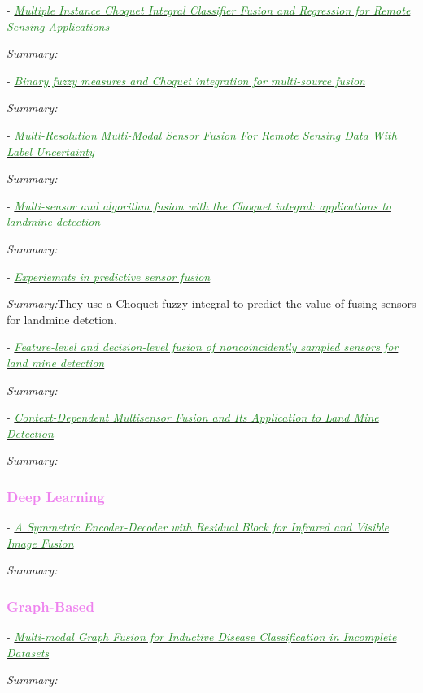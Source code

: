 \documentclass[]{article}
\newcommand{\paperentry}[4]{
            \hangindent=1cm
            \textcolor{red}{\cite{#1}} - \href{run:../References/#3}{\textcolor{ForestGreen}{\textit{#2}}}
            
            \noindent            
            \begin{minipage}[t]{0.1\linewidth}\hfill\end{minipage}
            \begin{minipage}[t]{0.8\linewidth}\textcolor{NavyBlue}{{\textit{Summary:}}}#4\end{minipage}
            \vspace{.25cm}
          }
\begin{document}
			\paperentry{Du2019MIChoquetIntegral}
			{Multiple Instance Choquet Integral Classifier Fusion and Regression for Remote Sensing Applications}
			{Fusion/Choquet/Du2019MIChoquetIntegral.pdf}
			{}
		
			\paperentry{Anderson2017BinaryFuzzyMeasureChoquetIntegral}
			{Binary fuzzy measures and Choquet integration for multi-source fusion}
			{Fusion/Choquet/Anderson2017BinaryFuzzyMeasureChoquetIntegral.pdf}
			{}
			
			\paperentry{Du2018MultiResolutionSensorFusion}
			{Multi-Resolution Multi-Modal Sensor Fusion For Remote Sensing Data With Label Uncertainty}
			{Fusion/Choquet/Du2018MultiResolutionSensorFusion.pdf}
			{}
			
			\paperentry{Gader2004ChoquetIntegralLandmine}
			{Multi-sensor and algorithm fusion with the Choquet integral: applications to landmine detection}
			{Fusion/Choquet/Gader2004ChoquetIntegralLandmine.pdf}
			{}
			
			\paperentry{Keller2001PredictiveSensorFusion}
			{Experiemnts in predictive sensor fusion}
			{Fusion/Keller2001PredictiveSensorFusion.pdf}
			{They use a Choquet fuzzy integral to predict the value of fusing sensors for landmine detction.}
			
			\paperentry{Gunatilaka2001FusionNoncoincidentlySampledLandmine}
			{Feature-level and decision-level fusion of noncoincidently sampled sensors for land mine detection}
			{Fusion/Gunatilaka2001FusionNoncoincidentlySampledLandmine.pdf}
			{}
		
			\paperentry{Frigui2010ContextDependentFusionLandmine}
			{Context-Dependent Multisensor Fusion and Its Application to Land Mine Detection}
			{Fusion/Frigui2010ContextDependentFusionLandmine.pdf}
			{}
			
			
		\textcolor{Violet}{\subsubsection{Deep Learning}}
		
			\paperentry{Jian2019AEInfraredVisibleFusion}
			{A Symmetric Encoder-Decoder with Residual Block for Infrared and Visible Image Fusion}
			{Fusion/DeepLearning/Jian2019AEInfraredVisibleFusion.pdf}
			{}
		
		\textcolor{Violet}{\subsubsection{Graph-Based}}
		
			\paperentry{Vivar2019MultiModalGraphFusion}
			{Multi-modal Graph Fusion for Inductive Disease Classification in Incomplete Datasets}
			{Fusion/GraphBased/Vivar2019MultiModalGraphFusion.pdf}
			{}
	
\end{document}

